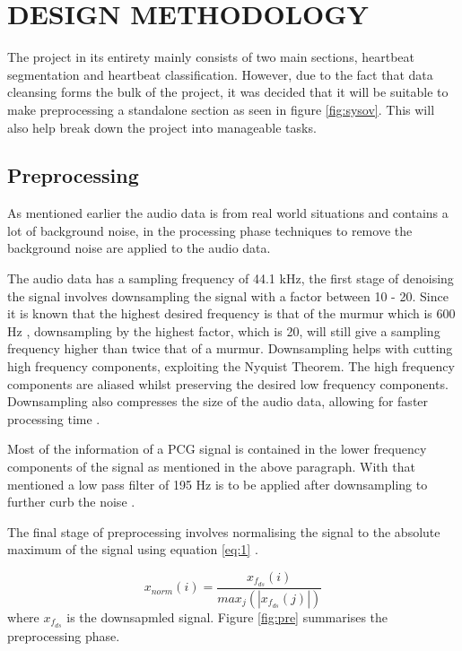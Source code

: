 \documentclass[10pt,twocolumn]{witseiepaper}
\begin{document}
%
\section{DESIGN METHODOLOGY}

The project in its entirety mainly consists of two main sections, heartbeat segmentation and heartbeat classification. However, due to the fact that data cleansing forms the bulk of the project, it was decided that it will be suitable to make preprocessing a standalone section as seen in figure \ref{fig:sysov}. This will also help break down the project into manageable tasks.

\subsection{Preprocessing}
As mentioned earlier the audio data is from real world situations and contains a lot of background noise, in the processing phase techniques to remove the background noise are applied to the audio data.

The audio data has a sampling frequency of 44.1 kHz, the first stage of denoising the signal involves downsampling the signal with a factor between 10 - 20. Since it is known that the highest desired frequency is that of the murmur which is 600 Hz \cite{mumur}, downsampling by the highest factor, which is 20, will still give a sampling frequency higher than twice that of a murmur. Downsampling helps with cutting high frequency components, exploiting the Nyquist Theorem. The high frequency components are aliased whilst preserving the desired low frequency components. Downsampling also compresses the size of the audio data, allowing for faster processing time \cite{lavry2004sampling}.

Most of the information of a PCG signal is contained in the lower frequency components of the signal as mentioned in the above paragraph. With that mentioned a low pass filter of 195 Hz is to be applied after downsampling to further curb the noise \cite{pascal}.

The final stage of preprocessing involves normalising the signal to the absolute maximum of the signal using equation \ref{eq:1} \cite{liang1997heart}.

\begin{equation}
    x_{norm}(i) = \frac{x_{f_{ds}}(i)}{max_{j}(|x_{f_{ds}}(j)|)}
    \label{eq:1}
\end{equation}{}
where $x_{f_{ds}}$ is the downsapmled signal. 
Figure \ref{fig:pre} summarises the preprocessing phase.
\end{document}
